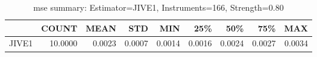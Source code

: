 \begin{table}[ht]
\centering
\caption{mse summary: Estimator=JIVE1, Instruments=166, Strength=0.80}
\begin{tabular}{lrrrrrrrr}
\toprule
 & COUNT & MEAN & STD & MIN & 25\% & 50\% & 75\% & MAX \\
\midrule
JIVE1 & 10.0000 & 0.0023 & 0.0007 & 0.0014 & 0.0016 & 0.0024 & 0.0027 & 0.0034 \\
\bottomrule
\end{tabular}
\end{table}
